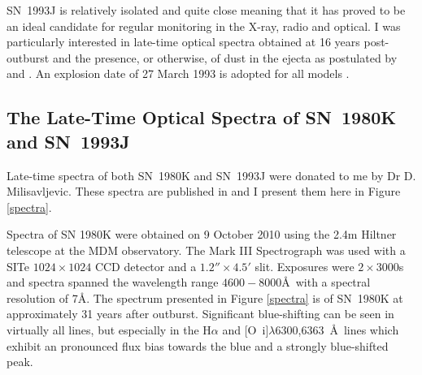 SN~1993J is relatively isolated and quite close meaning that it has proved to be an ideal candidate for regular monitoring in the X-ray, radio and optical.  I was particularly interested in late-time optical spectra obtained at 16 years post-outburst and the presence, or otherwise, of dust in the ejecta as postulated by \citet{Fransson2005} and \citep{Milisavljevic2012}.  An explosion date of 27 March 1993 is adopted for all models \citep{Baron1993}.

\subsection{The Late-Time Optical Spectra of SN~1980K and SN~1993J}

Late-time spectra of both SN~1980K and SN~1993J were donated to me by Dr D. Milisavljevic.  These spectra are published in \citet{Milisavljevic2012} and I present them here in Figure \ref{spectra}.

Spectra of SN 1980K were obtained on 9 October 2010 using the  2.4m Hiltner telescope at the MDM observatory. The Mark III Spectrograph was used with a SITe $1024 \times 1024$ CCD detector and a $1.2'' \times 4.5'$ slit. Exposures were $2 \times 3000$s and spectra spanned the wavelength range $4600-8000$\AA\ with a spectral resolution of 7\AA. The spectrum presented in Figure \ref{spectra} is of SN~1980K at approximately 31 years after outburst. Significant blue-shifting can be seen in virtually all lines, but especially in the H$\alpha$ and [O~{\sc i}]$\lambda$6300,6363~\AA\ lines which exhibit an pronounced flux bias towards the blue and a strongly blue-shifted peak.

